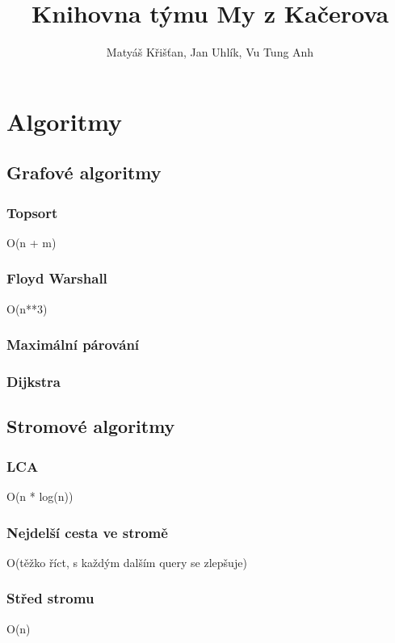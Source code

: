\documentclass{article}
\title{Knihovna týmu My z Kačerova}
\author{Matyáš Křišťan, Jan Uhlík, Vu Tung Anh}
\begin{document}
\tableofcontents

\section{Algoritmy}
\subsection{Grafové algoritmy}

\subsubsection{Topsort}
O(n + m)


\subsubsection{Floyd Warshall}
O(n**3)


\subsubsection{Maximální párování}


\subsubsection{Dijkstra}


\subsection{Stromové algoritmy}
\subsubsection{LCA}
O(n * log(n))


\subsubsection{Nejdelší cesta ve stromě}
O(těžko říct, s každým dalším query se zlepšuje)


\subsubsection{Střed stromu}
O(n)

\end{document}
